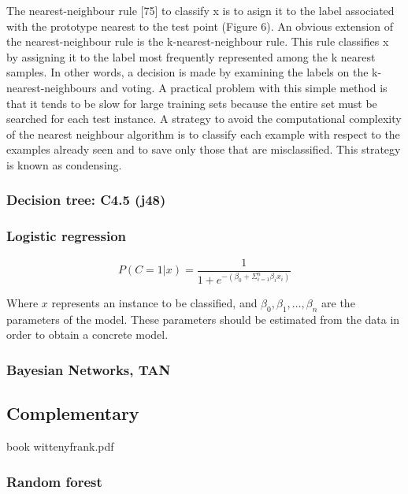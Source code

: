 \documentclass[conference,a4paper]{IEEEtran}
\begin{document}
The nearest-neighbour rule [75] to classify x is to asign it to the label associated with the prototype nearest to the test point (Figure 6). An obvious extension of the nearest-neighbour rule is the k-nearest-neighbour rule. This rule classifies x by assigning it to the label most frequently represented among the k nearest samples. In other words, a decision is made by examining the labels on the k-nearest-neighbours and voting.
A practical problem with this simple method is that it tends to be slow for large training sets because the entire set must be searched for each test instance. A strategy to avoid the computational complexity of the nearest neighbour algorithm is to classify each example with respect to the examples already seen and to save only those that are misclassified. This strategy is known as condensing.

\subsubsection{Decision tree: C4.5 (j48)}



\subsubsection{Logistic regression}


\begin{equation}
	P(C = 1 | x) = \frac{1}{1 + e^{-(\beta_{0} + \Sigma^{n}_{i=1} \beta_{i} x_{i})}}
	\label{eq:logistic}
\end{equation}

Where $x$ represents an instance to be classified, and $\beta_0, \beta_1, \dots , \beta_n$ are the parameters of the model. These parameters should be estimated from the data in order to obtain a concrete model.

\subsubsection{Bayesian Networks, TAN}


\subsection{Complementary}

book wittenyfrank.pdf

\subsubsection{Random forest}
\end{document}
